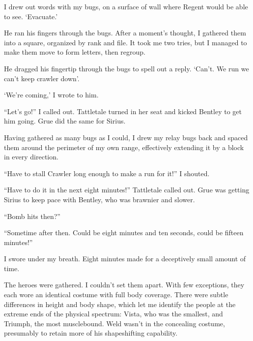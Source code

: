 I drew out words with my bugs, on a surface of wall where Regent would be able to see.  `Evacuate.'



He ran his fingers through the bugs.  After a moment's thought, I gathered them into a square, organized by rank and file.  It took me two tries, but I managed to make them move to form letters, then regroup.



He dragged his fingertip through the bugs to spell out a reply.  `Can't.  We run we can't keep crawler down'.



`We're coming,' I wrote to him.



``Let's go!''  I called out.  Tattletale turned in her seat and kicked Bentley to get him going.  Grue did the same for Sirius.



Having gathered as many bugs as I could, I drew my relay bugs back and spaced them around the perimeter of my own range, effectively extending it by a block in every direction.



``Have to stall Crawler long enough to make a run for it!''  I shouted.



``Have to do it in the next eight minutes!''  Tattletale called out.  Grue was getting Sirius to keep pace with Bentley, who was brawnier and slower.



``Bomb hits then?''



``Sometime after then.  Could be eight minutes and ten seconds, could be fifteen minutes!''



I swore under my breath.  Eight minutes made for a deceptively small amount of time.



The heroes were gathered.  I couldn't set them apart.  With few exceptions, they each wore an identical costume with full body coverage.  There were subtle differences in height  and body shape, which let me identify the people at the extreme ends of the physical spectrum: Vista, who was the smallest, and Triumph, the most musclebound.  Weld wasn't in the concealing costume, presumably to retain more of his shapeshifting capability.



